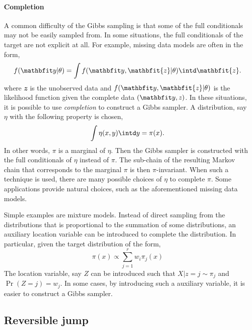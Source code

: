 

\paragraph{Completion}

A common difficulty of the Gibbs sampling is that some of the full conditionals may not be easily sampled from. In some situations, the full conditionals of the target are not explicit at all. For example, missing data models are often in the form,
\begin{equation*}
  f(\data|\theta) = \int f(\data, \mathbfit{z}|\theta)\intd \mathbfit{z}.
\end{equation*}
where $\mathbfit{z}$ is the unobserved data and $f(\data,\mathbfit{z}|\theta)$ is the likelihood function given the complete data $(\data,\mathit{z})$. In these situations, it is possible to use \emph{completion} to construct a Gibbs sampler. A distribution, say $\eta$ with the following property is chosen,
\begin{equation}
  \int\eta(x,y)\intd y = \pi(x).
\end{equation}
In other words, $\pi$ is a marginal of $\eta$. Then the Gibbs sampler is constructed with the full conditionals of $\eta$ instead of $\pi$. The sub-chain of the resulting Markov chain that corresponds to the marginal $\pi$ is then $\pi$-invariant. When such a technique is used, there are many possible choices of $\eta$ to complete $\pi$. Some applications provide natural choices, such as the aforementioned missing data models.
\begin{draftpar}
Simple examples are mixture models. Instead of direct sampling from the distributions that is proportional to the summation of some distributions, an auxiliary location variable can be introduced to complete the distribution. In particular, given the target distribution of the form,
\begin{equation*}
  \pi(x) \propto \sum_{j=1}^r w_i\pi_j(x)
\end{equation*}
The location variable, say $Z$ can be introduced such that $X|z=j\sim \pi_j$ and $\Pr(Z=j) = w_j$. In some cases, by introducing such a auxiliary variable, it is easier to construct a Gibbs sampler.
\end{draftpar}

\subsection{Reversible jump \protect\mcmc}
\label{sub:Reversible jump mcmc}

